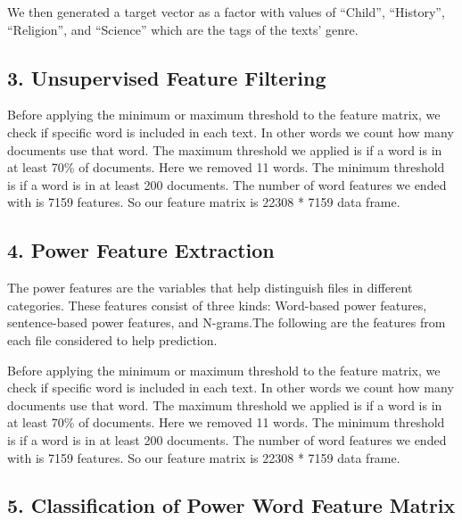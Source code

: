 \documentclass[]{article}
\begin{document}
We then generated a target vector as a factor with values of ``Child'',
``History'', ``Religion'', and ``Science'' which are the tags of the
texts' genre.

\subsection{{3. Unsupervised Feature
Filtering}}\label{unsupervised-feature-filtering}

Before applying the minimum or maximum threshold to the feature matrix,
we check if specific word is included in each text. In other words we
count how many documents use that word. The maximum threshold we applied
is if a word is in at least 70\% of documents. Here we removed 11 words.
The minimum threshold is if a word is in at least 200 documents. The
number of word features we ended with is 7159 features. So our feature
matrix is 22308 * 7159 data frame.

\subsection{{4. Power Feature
Extraction}}\label{power-feature-extraction}

The power features are the variables that help distinguish files in
different categories. These features consist of three kinds: Word-based
power features, sentence-based power features, and N-grams.The following
are the features from each file considered to help prediction.

Before applying the minimum or maximum threshold to the feature matrix,
we check if specific word is included in each text. In other words we
count how many documents use that word. The maximum threshold we applied
is if a word is in at least 70\% of documents. Here we removed 11 words.
The minimum threshold is if a word is in at least 200 documents. The
number of word features we ended with is 7159 features. So our feature
matrix is 22308 * 7159 data frame.

\subsection{{5. Classification of Power Word Feature
Matrix}}\label{classification-of-power-word-feature-matrix}
\end{document}
